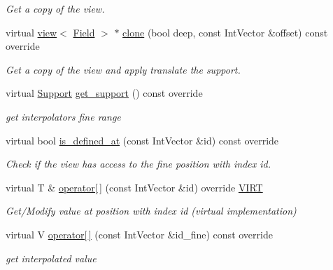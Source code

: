 \begin{DoxyCompactItemize}
\begin{DoxyCompactList}\small\item\em Get a copy of the view. \end{DoxyCompactList}\item 
virtual \hyperlink{classUintah_1_1PhaseField_1_1detail_1_1view}{view}$<$ \hyperlink{structUintah_1_1PhaseField_1_1ScalarField}{Field} $>$ $\ast$ \hyperlink{classUintah_1_1PhaseField_1_1detail_1_1amr__interpolator_3_01ScalarField_3_01T_01_4_00_01Problemd2db9de1754b5450c93c191a9275f5ed_a62362155afcaf1db632655a3a8ab23f4}{clone} (bool deep, const Int\+Vector \&offset) const override
\begin{DoxyCompactList}\small\item\em Get a copy of the view and apply translate the support. \end{DoxyCompactList}\item 
virtual \hyperlink{classUintah_1_1PhaseField_1_1Support}{Support} \hyperlink{classUintah_1_1PhaseField_1_1detail_1_1amr__interpolator_3_01ScalarField_3_01T_01_4_00_01Problemd2db9de1754b5450c93c191a9275f5ed_a62fab5a21bbdb676abc26812e2935b43}{get\+\_\+support} () const override
\begin{DoxyCompactList}\small\item\em get interpolator\textquotesingle{}s fine range \end{DoxyCompactList}\item 
virtual bool \hyperlink{classUintah_1_1PhaseField_1_1detail_1_1amr__interpolator_3_01ScalarField_3_01T_01_4_00_01Problemd2db9de1754b5450c93c191a9275f5ed_af8195600d1dd48eb942fb86df76e3127}{is\+\_\+defined\+\_\+at} (const Int\+Vector \&id) const override
\begin{DoxyCompactList}\small\item\em Check if the view has access to the fine position with index id. \end{DoxyCompactList}\item 
virtual T \& \hyperlink{classUintah_1_1PhaseField_1_1detail_1_1amr__interpolator_3_01ScalarField_3_01T_01_4_00_01Problemd2db9de1754b5450c93c191a9275f5ed_a1b98af006f3ad7a60aa33f7c4dc02ea2}{operator\mbox{[}$\,$\mbox{]}} (const Int\+Vector \&id) override \hyperlink{Definitions_8h_a3ce9c14452594b5b9ee3b63f9b3a981e}{V\+I\+RT}
\begin{DoxyCompactList}\small\item\em Get/\+Modify value at position with index id (virtual implementation) \end{DoxyCompactList}\item 
virtual V \hyperlink{classUintah_1_1PhaseField_1_1detail_1_1amr__interpolator_3_01ScalarField_3_01T_01_4_00_01Problemd2db9de1754b5450c93c191a9275f5ed_a92258242d6be3d033373def65b687a94}{operator\mbox{[}$\,$\mbox{]}} (const Int\+Vector \&id\+\_\+fine) const override
\begin{DoxyCompactList}\small\item\em get interpolated value \end{DoxyCompactList}\end{DoxyCompactItemize}
